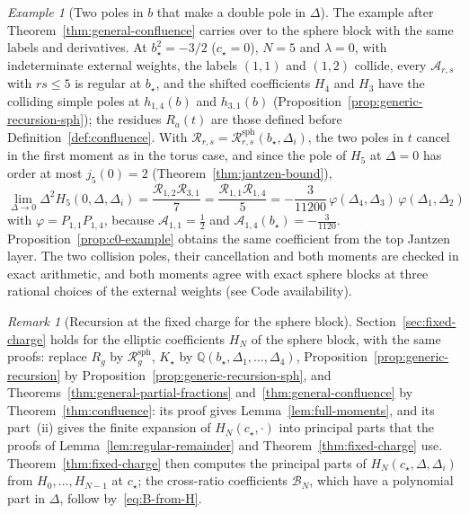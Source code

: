 \documentclass[twoside,10pt]{article}
\numberwithin{equation}{section}
\theoremstyle{slbody}
\theoremstyle{definition}
\theoremstyle{remark}
\newtheorem{remark}[theorem]{Remark}
\newtheorem*{example*}{Example}
\begin{document}
\begin{example*}[Two poles in \(b\) that make a double pole in \(\Delta\)]
The example after Theorem~\ref{thm:general-confluence} carries over to the
sphere block with the same labels and derivatives.  At \(b_\star^2=-3/2\)
(\(c_\star=0\)), \(N=5\) and \(\lambda=0\), with indeterminate external
weights, the labels \((1,1)\) and \((1,2)\) collide, every \(\mathcal A_{r,s}\)
with \(rs\leq5\) is regular at \(b_\star\), and the shifted coefficients \(H_4\)
and \(H_3\) have the colliding simple poles at \(h_{1,4}(b)\) and \(h_{3,1}(b)\)
(Proposition~\ref{prop:generic-recursion-sph}); the residues \(R_a(t)\) are
those defined before Definition~\ref{def:confluence}.  With
\(\mathcal R_{r,s}=\mathcal R^{\mathrm{sph}}_{r,s}(b_\star,\Delta_i)\), the two
poles in \(t\) cancel in the first moment as in the torus case, and since the
pole of \(H_5\) at \(\Delta=0\) has order at most \(j_5(0)=2\)
(Theorem~\ref{thm:jantzen-bound}),
\[
 \lim_{\Delta\to0}\Delta^2H_5(0,\Delta,\Delta_i)
 =\frac{\mathcal R_{1,2}\mathcal R_{3,1}}{7}
 =\frac{\mathcal R_{1,1}\mathcal R_{1,4}}{5}
 =-\frac{3}{11200}\,\varphi(\Delta_4,\Delta_3)\,\varphi(\Delta_1,\Delta_2)
\]
with \(\varphi=P_{1,1}P_{1,4}\), because \(\mathcal A_{1,1}=\tfrac12\) and
\(\mathcal A_{1,4}(b_\star)=-\tfrac3{1120}\).  Proposition~\ref{prop:c0-example}
obtains the same coefficient from the top Jantzen layer.  The two collision
poles, their cancellation and both moments are checked in exact arithmetic,
and both moments agree with exact sphere blocks at three rational choices of
the external weights (see Code availability).
\end{example*}

\begin{remark}[Recursion at the fixed charge for the sphere block]
\label{rem:fixed-charge-sph}
Section~\ref{sec:fixed-charge} holds for the elliptic coefficients \(H_N\) of
the sphere block, with the same proofs: replace \(R_g\) by
\(\mathcal R^{\mathrm{sph}}_g\), \(K_\star\) by
\(\mathbb Q(b_\star,\Delta_1,\dots,\Delta_4)\),
Proposition~\ref{prop:generic-recursion} by
Proposition~\ref{prop:generic-recursion-sph}, and
Theorems~\ref{thm:general-partial-fractions} and~\ref{thm:general-confluence}
by Theorem~\ref{thm:confluence}: its proof gives
Lemma~\ref{lem:full-moments}, and its part~(ii) gives the finite expansion of
\(H_N(c_\star,\cdot)\) into principal parts that the proofs of
Lemma~\ref{lem:regular-remainder} and Theorem~\ref{thm:fixed-charge} use.  Theorem~\ref{thm:fixed-charge}
then computes the principal parts of \(H_N(c_\star,\Delta,\Delta_i)\) from
\(H_0,\dots,H_{N-1}\) at \(c_\star\); the cross-ratio coefficients
\(\mathcal B_N\), which have a polynomial part in \(\Delta\), follow
by~\eqref{eq:B-from-H}.
\end{remark}
\end{document}

